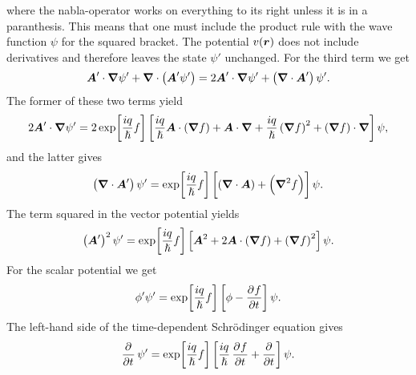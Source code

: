         where the nabla-operator works on everything to its right unless it is
        in a paranthesis.
        This means that one must include the product rule with the wave function
        $\psi$ for the squared bracket.
        The potential $v(\boldsymbol{r})$ does not include derivatives and therefore
        leaves the state $\psi'$ unchanged.
        For the third term we get
        \begin{align}
            \boldsymbol{A}'\cdot\boldsymbol{\nabla}\psi'
            +
            \boldsymbol{\nabla}\cdot\left( 
                \boldsymbol{A}'\psi'
             \right)
            =
            2
            \boldsymbol{A}'\cdot\boldsymbol{\nabla}\psi'
            +
            \left( \boldsymbol{\nabla}\cdot\boldsymbol{A}' \right)\psi'.
        \end{align}
        The former of these two terms yield
        \begin{align}
            2\boldsymbol{A}'\cdot\boldsymbol{\nabla}\psi'
            = 2\exp[\frac{iq}{\hslash}f]
            \left[ 
                \frac{iq}{\hslash}
                \boldsymbol{A}\cdot\left( \boldsymbol{\nabla}f \right)
                + \boldsymbol{A}\cdot\boldsymbol{\nabla}
                + \frac{iq}{\hslash}
                \left( \boldsymbol{\nabla}f \right)^2
                + \left( \boldsymbol{\nabla}f \right)\cdot\boldsymbol{\nabla}
             \right]\psi,
        \end{align}
        and the latter gives
        \begin{align}
            \left( \boldsymbol{\nabla}\cdot\boldsymbol{A}' \right)\psi'
            =
            \exp[\frac{iq}{\hslash}f]
            \left[ 
                \left( \boldsymbol{\nabla}\cdot\boldsymbol{A} \right)
                + \left( \boldsymbol{\nabla}^2f \right)
             \right]\psi.
        \end{align}
        The term squared in the vector potential yields
        \begin{align}
            \left( \boldsymbol{A}' \right)^2\psi'
            =
            \exp[\frac{iq}{\hslash}f]
            \left[ 
                \boldsymbol{A}^2
                + 2\boldsymbol{A}\cdot\left( \boldsymbol{\nabla}f \right)
                + \left( \boldsymbol{\nabla}f \right)^2
             \right]\psi.
        \end{align}
        For the scalar potential we get
        \begin{align}
            \phi'\psi'
            = \exp[\frac{iq}{\hslash}f]\brak{
                \phi
                - \dpd{f}{t}
            }\psi.
        \end{align}
        The left-hand side of the time-dependent Schrödinger equation gives
        \begin{align}
            \dpd{}{t}
            \psi'
            =
            \exp[\frac{iq}{\hslash}f]
            \brak{
                \frac{iq}{\hslash}\dpd{f}{t}
                + \dpd{}{t}
            }\psi.
        \end{align}

